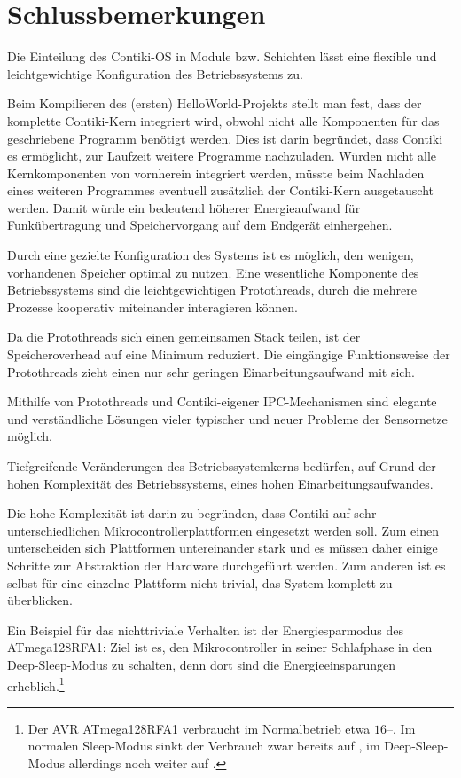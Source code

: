 \chapter{Schlussbemerkungen}
\label{sec:fazit}

	Die Einteilung des Contiki-OS in Module bzw. Schichten lässt eine
	flexible und leichtgewichtige Konfiguration des Betriebssystems zu.

	Beim Kompilieren des (ersten) HelloWorld-Projekts stellt man fest,
	dass der komplette Contiki-Kern integriert wird,
	obwohl nicht alle Komponenten für das geschriebene Programm benötigt
	werden.
	Dies ist darin begründet, dass Contiki es ermöglicht, zur Laufzeit
	weitere Programme nachzuladen.  Würden nicht alle Kernkomponenten
	von vornherein integriert werden, müsste beim Nachladen eines weiteren
	Programmes eventuell zusätzlich der Contiki-Kern ausgetauscht werden.
	Damit würde ein bedeutend höherer Energieaufwand für Funkübertragung
	und Speichervorgang auf dem Endgerät einhergehen.

\medskip

	Durch eine gezielte Konfiguration des Systems ist es möglich, den
	wenigen,
	vorhandenen Speicher optimal zu nutzen.  Eine wesentliche Komponente
	des Betriebssystems sind die leichtgewichtigen Protothreads, durch die
	mehrere Prozesse kooperativ miteinander interagieren können.

	Da die Protothreads sich einen gemeinsamen Stack teilen, ist der
	Speicheroverhead auf eine Minimum reduziert.
	Die eingängige Funktionsweise der Protothreads zieht
	einen nur sehr geringen Einarbeitungsaufwand mit sich.

	Mithilfe von Protothreads und Contiki-eigener IPC-Mechanismen sind
	elegante und verständliche Lösungen vieler typischer und neuer Probleme
	der Sensornetze möglich.

\medskip

	Tiefgreifende Veränderungen des Betriebssystemkerns bedürfen,
	auf Grund der hohen Komplexität des Betriebssystems, eines hohen
	Einarbeitungsaufwandes.

	Die hohe Komplexität ist darin zu begründen, dass Contiki auf sehr
	unterschiedlichen Mikrocontrollerplattformen eingesetzt werden soll.
	Zum einen unterscheiden sich Plattformen untereinander stark und es
	müssen daher einige Schritte zur Abstraktion der Hardware durchgeführt
	werden.
	Zum anderen ist
	es selbst für eine einzelne Plattform nicht trivial, das System
	komplett zu überblicken.

	Ein Beispiel für das nichttriviale Verhalten ist der Energiesparmodus
	des ATmega128RFA1: Ziel ist es, den Mikrocontroller in seiner
	Schlafphase in den Deep-Sleep-Modus zu schalten, denn dort sind die
	Energieeinsparungen erheblich.\footnote{Der AVR ATmega128RFA1 verbraucht
	im Normalbetrieb etwa \(16\)--.
	Im normalen Sleep-Modus sinkt der Verbrauch zwar bereits auf
	, im Deep-Sleep-Modus allerdings noch weiter auf
	.}

